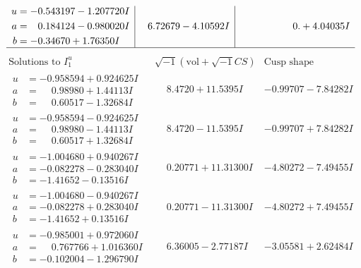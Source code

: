 \documentclass[1p]{elsarticle_modified}
\theoremstyle{definition}
\newcommand{\I}{\sqrt{-1}}
\begin{document}
$$\begin{array}{c|c|c}
\begin{aligned}
u &= -0.543197 - 1.207720 I \\
a &= \phantom{-}0.184124 - 0.980020 I \\
b &= -0.34670 + 1.76350 I\end{aligned}
 & \phantom{-}6.72679 - 4.10592 I & \phantom{-0.000000 -}0. + 4.04035 I\\
 \hline 
 \end{array}$$\newpage$$\begin{array}{c|c|c}  
\text{Solutions to }I^u_{1}& \I (\text{vol} + \sqrt{-1}CS) & \text{Cusp shape}\\
 \hline 
\begin{aligned}
u &= -0.958594 + 0.924625 I \\
a &= \phantom{-}0.98980 + 1.44113 I \\
b &= \phantom{-}0.60517 - 1.32684 I\end{aligned}
 & \phantom{-}8.4720 + 11.5395 I & -0.99707 - 7.84282 I \\ \hline\begin{aligned}
u &= -0.958594 - 0.924625 I \\
a &= \phantom{-}0.98980 - 1.44113 I \\
b &= \phantom{-}0.60517 + 1.32684 I\end{aligned}
 & \phantom{-}8.4720 - 11.5395 I & -0.99707 + 7.84282 I \\ \hline\begin{aligned}
u &= -1.004680 + 0.940267 I \\
a &= -0.082278 - 0.283040 I \\
b &= -1.41652 - 0.13516 I\end{aligned}
 & \phantom{-}0.20771 + 11.31300 I & -4.80272 - 7.49455 I \\ \hline\begin{aligned}
u &= -1.004680 - 0.940267 I \\
a &= -0.082278 + 0.283040 I \\
b &= -1.41652 + 0.13516 I\end{aligned}
 & \phantom{-}0.20771 - 11.31300 I & -4.80272 + 7.49455 I \\ \hline\begin{aligned}
u &= -0.985001 + 0.972060 I \\
a &= \phantom{-}0.767766 + 1.016360 I \\
b &= -0.102004 - 1.296790 I\end{aligned}
 & \phantom{-}6.36005 - 2.77187 I & -3.05581 + 2.62484 I \\ \hline\begin{aligned}

\end{aligned}
\end{array}$$
\end{document}
